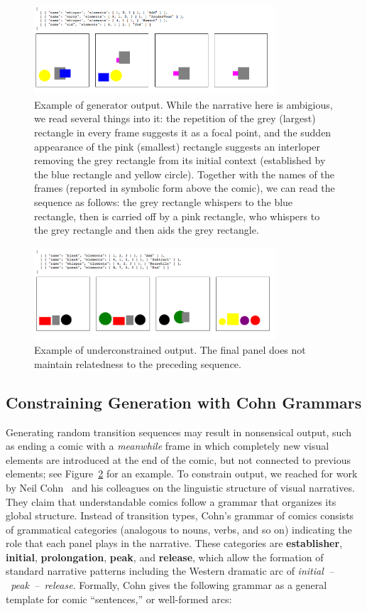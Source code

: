 \begin{figure}[h]
\centering
\includegraphics[width=9cm]{comicgen-unconstrained-ok.png}
\caption{Example of generator output.
While the narrative here is ambigious, we read several things into it:
the repetition of the grey (largest) rectangle in every frame suggests it
as a focal point, and the sudden appearance of the pink (smallest)
rectangle suggests an interloper removing the grey rectangle from its
initial context (established by the blue rectangle and yellow circle).
Together with the names of the frames (reported in symbolic form above the
comic), we can read the sequence as follows: the grey rectangle whispers to
the blue rectangle, then is carried off by a pink rectangle, who whispers
to the grey rectangle and then aids the grey rectangle.
}
\label{fig:out1}
\end{figure}

\begin{figure}
\centering
\includegraphics[width=9cm]{comicgen-underconstrained-2.png}
\caption{Example of underconstrained output. The final panel does not
maintain relatedness to the preceding sequence.}
\label{fig:outbad}
\end{figure}

\subsection{Constraining Generation with Cohn Grammars}
Generating random transition sequences may result in nonsensical output,
such as ending a comic with a \emph{meanwhile} frame in which completely new
visual elements are introduced at the end of the comic, but not connected to 
previous elements; see Figure~\ref{fig:outbad} for an example. 
To constrain output, we reached for work by Neil Cohn~\cite{cohn2016visual}
and his colleagues on the linguistic structure of visual narratives. They
claim that understandable comics follow a grammar that organizes its global
structure. Instead of transition types, Cohn's grammar of comics consists
of grammatical categories (analogous to nouns, verbs, and so on) indicating
the role that each panel plays in the narrative. These categories are {\bf
establisher}, {\bf initial}, {\bf prolongation}, {\bf peak}, and {\bf
release}, which allow the formation of standard narrative patterns
including the Western dramatic arc of \hbox{\em initial -- peak --
release}. Formally, Cohn gives the following grammar as a general template
for comic ``sentences,'' or well-formed arcs:

